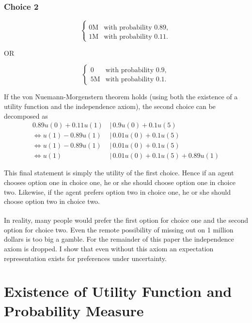 \documentclass{article}
\begin{document}
\subsubsection{Choice 2}

\begin{equation*}
\left\{
\begin{array}{rl}
\\0\text{M} & \text{with probability } 0.89,
\\1\text{M} & \text{with probability } 0.11.
\end{array} \right.
\end{equation*}

OR

\begin{equation*}
\left\{
\begin{array}{rl}
0 & \text{with probability } 0.9,
\\5\text{M} & \text{with probability } 0.1.
\end{array} \right.
\end{equation*}

If the von Nuemann-Morgenstern theorem holds (using both the existence of a utility function and the independence axiom), the second choice can be decomposed as 
\begin{align*}
0.89u(0)+0.11u(1)\, &|\, 0.9u(0)+0.1u(5) \\
\Leftrightarrow u(1)-0.89u(1) \, &|\, 0.01u(0)+0.1u(5) \\
\Leftrightarrow u(1)-0.89u(1) \, &|\, 0.01u(0)+0.1u(5) \\
\Leftrightarrow u(1) \, &|\, 0.01u(0)+0.1u(5)+0.89u(1)
\end{align*}

This final statement is simply the utility of the first choice.  Hence if an agent chooses option one in choice one, he or she should choose option one in choice two.  Likewise, if the agent prefers option two in choice one, he or she should choose option two in choice two.
\\
\\
In reality, many people would prefer the first option for choice one and the second option for choice two.  Even the remote possibility of missing out on 1 million dollars is too big a gamble. For the remainder of this paper the independence axiom is dropped.  I show that even without this axiom an expectation representation exists for preferences under uncertainty.

 
\section{Existence of Utility Function and Probability Measure}
\end{document}
